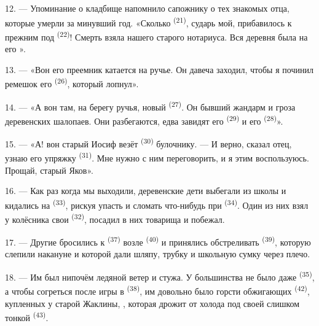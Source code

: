 12. --- Упоминание о кладбище напомнило сапожнику о тех знакомых отца,
которые умерли за минувший год. «Сколько  \textsuperscript{(21)},
сударь мой, прибавилось к прежним под  \textsuperscript{(22)}!
Смерть взяла нашего старого нотариуса. Вся деревня была на его
».

13. --- «Вон его преемник катается на ручье. Он давеча заходил, чтобы я
починил ремешок его  \textsuperscript{(26)}, который лопнул».

14. --- «А вон там, на берегу ручья, новый 
\textsuperscript{(27)}. Он бывший жандарм и гроза деревенских шалопаев. Они
разбегаются, едва завидят его  \textsuperscript{(29)} и его
 \textsuperscript{(28)}».

15. --- «А! вон старый Иосиф везёт  \textsuperscript{(30)}
булочнику. --- И верно, сказал отец, узнаю его упряжку 
\textsuperscript{(31)}. Мне нужно с ним переговорить, и я этим воспользуюсь.
Прощай, старый Яков».

16. --- Как раз когда мы выходили, деревенские дети выбегали из школы и
кидались на  \textsuperscript{(33)}, рискуя упасть и
сломать что-нибудь при  \textsuperscript{(34)}. Один из них
взял у колёсника свои  \textsuperscript{(32)}, посадил в них
товарища и побежал.

17. --- Другие бросились к  \textsuperscript{(37)} возле
 \textsuperscript{(40)} и принялись обстреливать  \textsuperscript{(39)}, которую слепили накануне и которой дали шляпу,
трубку и школьную сумку через плечо.

18. --- Им был нипочём ледяной ветер и стужа. У большинства не было даже
 \textsuperscript{(35)}, а чтобы согреться после игры в
 \textsuperscript{(38)}, им довольно было горсти обжигающих
 \textsuperscript{(42)}, купленных у старой Жаклины,
, которая дрожит от холода под своей слишком тонкой
 \textsuperscript{(43)}.

\VUsaut{3.0mm}
\VUsaut{3.0mm}

\VUsaut{4.0mm}

